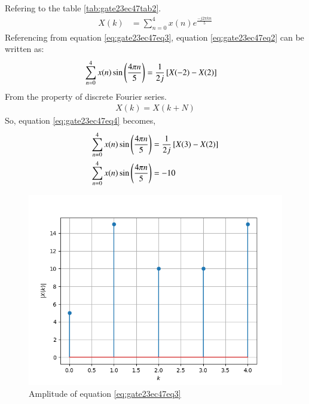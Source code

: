 \documentclass[journal,12pt,onecolumn]{IEEEtran}
\theoremstyle{remark}
\begin{document}
\begin{enumerate}
Refering to the table \ref{tab:gate23ec47tab2}.\\
\begin{align}
X(k)&=\sum\limits_{n=0}^{4} x(n)e^{\frac{-j2\pi kn}{5}}\label{eq:gate23ec47eq3}
\end{align}
Referencing from equation \eqref{eq:gate23ec47eq3}, equation \eqref{eq:gate23ec47eq2} can be written as:
\begin{align}
\sum\limits_{n=0}^{4}x(n) \sin\left(\frac{4\pi n}{5}\right)&=\frac{1}{2j}{}\left[X(-2)-X(2)\right]\label{eq:gate23ec47eq4}
\end{align}
From the property of discrete Fourier series.\\
\begin{align}
X(k)=X(k+N)
\end{align}
So, equation \eqref{eq:gate23ec47eq4} becomes,\\
\begin{align}
\sum\limits_{n=0}^{4}x(n) \sin\left(\frac{4\pi n}{5}\right)&=\frac{1}{2j}{}\left[X(3)-X(2)\right]\\
\sum\limits_{n=0}^{4}x(n) \sin\left(\frac{4\pi n}{5}\right)&=-10
\end{align}
\begin{figure}[htbp]
    \centering
    \includegraphics[width=\columnwidth]{figs/mm1.png}
    \caption{Amplitude of equation \eqref{eq:gate23ec47eq3}}
    \label{fig:gate23ec47fig1}
\end{figure}
\begin{figure}[htbp]
    \centering

\end{figure}
\end{enumerate}
\end{document}
